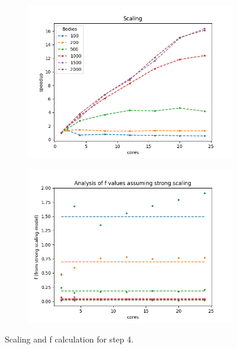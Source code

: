\documentclass{article}
\begin{document}
\begin{figure}[h!]
  \begin{center}
  \begin{subfigure}{.5\textwidth}
    \begin{center}
  \includegraphics[width=.95\textwidth]{scaling.png}
  \caption{}
  \label{fig:scaling_sub}
\end{center}
  \end{subfigure}%
  \begin{subfigure}{.5\textwidth}
    \begin{center}
    \includegraphics[width=.95\textwidth]{f.png}
    \caption{}
    \label{fig:scaling_f}
  \end{center}
    \end{subfigure}%
    \caption{Scaling and f calculation for step 4.}
  \label{fig:scaling}
\end{center}
\end{figure}
\end{document}
